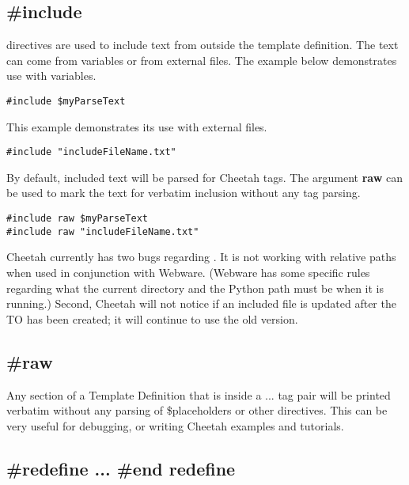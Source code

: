 {%
\subsection{\#include}

 directives are used to include text from outside the template
definition.  The text can come from  variables or from
external files.  The example below demonstrates use with 
variables.

\begin{verbatim}
#include $myParseText
\end{verbatim}

This example demonstrates its use with external files.
\begin{verbatim}
#include "includeFileName.txt"
\end{verbatim}

By default, included text will be parsed for Cheetah tags.  The argument
{\bf raw} can be used to mark the text for verbatim inclusion without any tag
parsing.

\begin{verbatim}
#include raw $myParseText
#include raw "includeFileName.txt"
\end{verbatim}

Cheetah currently has two bugs regarding .  It is not working
with relative paths when used in conjunction with Webware.  (Webware has some
specific rules regarding what the current directory and the Python path must be
when it is running.)  Second, Cheetah will not notice if an included file is
updated after the TO has been created; it will continue to use the old version.

\subsection{\#raw}
Any section of a Template Definition that is inside a  ...
 tag pair will be printed verbatim without any parsing of
\$placeholders or other directives.  This can be very useful for debugging, or
writing Cheetah examples and tutorials.


\subsection{\#redefine ... \#end redefine}

}
